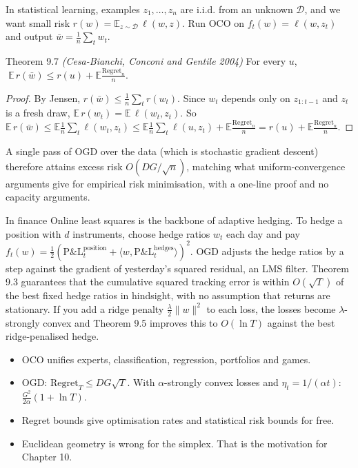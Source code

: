 \documentclass[11pt,a4paper,openany]{book}
\newcommand{\E}{\mathbb{E}}
\newcommand{\Reg}{\mathrm{Regret}}
\newcommand{\ip}[2]{\langle #1,#2\rangle}
\newcommand{\norm}[1]{\lVert #1\rVert}
\begin{document}
In statistical learning, examples $z_1,\dots,z_n$ are i.i.d. from an unknown $\mathcal D$, and we want small risk $r(w)=\E_{z\sim\mathcal D}\,\ell(w,z)$. Run OCO on $f_t(w)=\ell(w,z_t)$ and output $\bar w=\frac1n\sum_tw_t$.

\begin{bthm}{Theorem 9.7 \emph{(Cesa-Bianchi, Conconi and Gentile 2004)}}
For every $u$, $\;\E\,r(\bar w)\le r(u)+\E\frac{\Reg_n}{n}$.
\end{bthm}

\begin{proof}
By Jensen, $r(\bar w)\le\frac1n\sum_tr(w_t)$. Since $w_t$ depends only on $z_{1:t-1}$ and $z_t$ is a fresh draw, $\E\,r(w_t)=\E\,\ell(w_t,z_t)$. So $\E\,r(\bar w)\le\E\frac1n\sum_t\ell(w_t,z_t)\le\E\frac1n\sum_t\ell(u,z_t)+\E\frac{\Reg_n}n=r(u)+\E\frac{\Reg_n}n$.
\end{proof}

A single pass of OGD over the data (which is stochastic gradient descent) therefore attains excess risk $O(DG/\sqrt n)$, matching what uniform-convergence arguments give for empirical risk minimisation, with a one-line proof and no capacity arguments.

\begin{bfin}{In finance}
Online least squares is the backbone of adaptive hedging. To hedge a position with $d$ instruments, choose hedge ratios $w_t$ each day and pay $f_t(w)=\frac12(\text{P\&L}_t^{\text{position}}+\ip{w}{\text{P\&L}_t^{\text{hedges}}})^2$. OGD adjusts the hedge ratios by a step against the gradient of yesterday's squared residual, an LMS filter. Theorem 9.3 guarantees that the cumulative squared tracking error is within $O(\sqrt T)$ of the best fixed hedge ratios in hindsight, with no assumption that returns are stationary. If you add a ridge penalty $\frac\lambda2\norm w^2$ to each loss, the losses become $\lambda$-strongly convex and Theorem 9.5 improves this to $O(\ln T)$ against the best ridge-penalised hedge.
\end{bfin}

\begin{takeaways}
\begin{itemize}
\item OCO unifies experts, classification, regression, portfolios and games.
\item OGD: $\Reg_T\le DG\sqrt T$. With $\alpha$-strongly convex losses and $\eta_t=1/(\alpha t)$: $\frac{G^2}{2\alpha}(1+\ln T)$.
\item Regret bounds give optimisation rates and statistical risk bounds for free.
\item Euclidean geometry is wrong for the simplex. That is the motivation for Chapter 10.
\end{itemize}
\end{takeaways}
\end{document}
